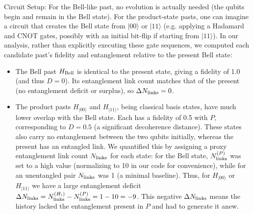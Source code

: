 \documentclass[11pt]{article}
\begin{document}
Circuit Setup: For the Bell-like past, no evolution is actually needed (the qubits begin and remain in the Bell state). For the product-state pasts, one can imagine a circuit that creates the Bell state from $|00\rangle$ or $|11\rangle$ (e.g. applying a Hadamard and CNOT gates, possibly with an initial bit-flip if starting from $|11\rangle$). In our analysis, rather than explicitly executing these gate sequences, we computed each candidate past’s fidelity and entanglement relative to the present Bell state:
\begin{itemize}
    \item The Bell past $H_{\rm Bell}$ is identical to the present state, giving a fidelity of 1.0 (and thus $D=0$). Its entanglement link count matches that of the present (no entanglement deficit or surplus), so $\Delta N_{\rm links} = 0$.
    \item The product pasts $H_{|00\rangle}$ and $H_{|11\rangle}$, being classical basis states, have much lower overlap with the Bell state. Each has a fidelity of 0.5 with $P$, corresponding to $D = 0.5$ (a significant decoherence distance). These states also carry no entanglement between the two qubits initially, whereas the present has an entangled link. We quantified this by assigning a proxy entanglement link count $N_{\rm links}$ for each state: for the Bell state, $N_{\rm links}^{(P)}$ was set to a high value (normalizing to 10 in our code for convenience), while for an unentangled pair $N_{\rm links}$ was 1 (a minimal baseline). Thus, for $H_{|00\rangle}$ or $H_{|11\rangle}$ we have a large entanglement deficit $\Delta N_{\rm links} = N_{\rm links}^{(H_i)} - N_{\rm links}^{(P)} = 1 - 10 = -9$. This negative $\Delta N_{\rm links}$ means the history lacked the entanglement present in $P$ and had to generate it anew.
\end{itemize}
\end{document}
